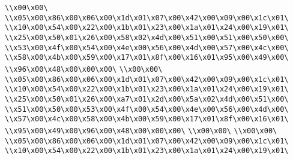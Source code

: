 \verb|\\x00\x00\|\newline
\verb|\\x05\x00\x86\x00\x06\x00\x1d\x01\x07\x00\x42\x00\x09\x00\x1c\x01\|\newline
\verb|\\x10\x00\x54\x00\x22\x00\x1b\x01\x23\x00\x1a\x01\x24\x00\x19\x01\|\newline
\verb|\\x25\x00\x50\x01\x26\x00\x58\x02\x4d\x00\x51\x00\x51\x00\x50\x00\|\newline
\verb|\\x53\x00\x4f\x00\x54\x00\x4e\x00\x56\x00\x4d\x00\x57\x00\x4c\x00\|\newline
\verb|\\x58\x00\x4b\x00\x59\x00\x17\x01\x8f\x00\x16\x01\x95\x00\x49\x00\|\newline
\verb|\\x96\x00\x48\x00\x00\x00\|\newline
\verb|\\x00\x00\|\newline
\verb|\\x05\x00\x86\x00\x06\x00\x1d\x01\x07\x00\x42\x00\x09\x00\x1c\x01\|\newline
\verb|\\x10\x00\x54\x00\x22\x00\x1b\x01\x23\x00\x1a\x01\x24\x00\x19\x01\|\newline
\verb|\\x25\x00\x50\x01\x26\x00\xa7\x01\x2d\x00\x5a\x02\x4d\x00\x51\x00\|\newline
\verb|\\x51\x00\x50\x00\x53\x00\x4f\x00\x54\x00\x4e\x00\x56\x00\x4d\x00\|\newline
\verb|\\x57\x00\x4c\x00\x58\x00\x4b\x00\x59\x00\x17\x01\x8f\x00\x16\x01\|\newline
\verb|\\x95\x00\x49\x00\x96\x00\x48\x00\x00\x00\|\newline
\verb|\\x00\x00\|\newline
\verb|\\x00\x00\|\newline
\verb|\\x05\x00\x86\x00\x06\x00\x1d\x01\x07\x00\x42\x00\x09\x00\x1c\x01\|\newline
\verb|\\x10\x00\x54\x00\x22\x00\x1b\x01\x23\x00\x1a\x01\x24\x00\x19\x01\|\newline
